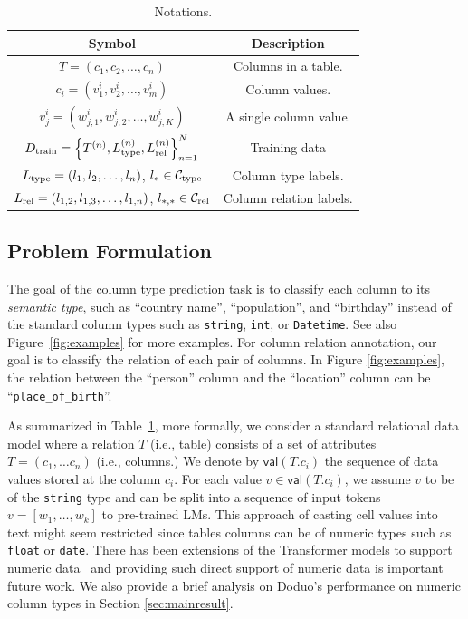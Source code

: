 \documentclass[sigconf]{acmart}
\newcommand{\name}{\mbox{\sc Doduo}}
\newcommand{\rev}[1]{#1}
\begin{document}
\begin{table}[t]
    \centering
    \caption{Notations.}\vspace{-1em}\label{tab:notation}
    {\footnotesize
    \begin{tabular}{c|c}\hline
      Symbol & Description \\\hline\hline
      $T = (c_1, c_2, \dots, c_{n})$ & Columns in a table. \\\hline
      $c_i = (v^i_1, v^i_2, \dots, v^i_{m})$ & Column values. \\\hline
      $v^i_j = (w^i_{j,1}, w^i_{j,2}, \dots, w^i_{j, K} )$ & A single column value. \\\hline
      $D_{\rm train} = \left\{ T^{(n)}, L_{\rm type}^{(n)}, L_{\rm rel}^{(n)} \right\}_{n=1}^N$ & Training data \\\hline
      $L_{\rm type} = (l_1, l_2, \dots, l_{n})$, 
      $l_* \in \mathcal{C}_{\rm type}$ & Column type labels. \\\hline
      $L_{\rm rel} = (l_{1,2}, l_{1,3}, \dots, l_{1, {n}})$, 
      $l_{*,*} \in \mathcal{C}_{\rm rel}$ & Column relation labels.\\\hline
    \end{tabular}
    }
    \vspace{-1em}
\end{table}



\subsection{Problem Formulation}
The goal of the column type prediction task is to classify each column to its \emph{semantic type}, such as
``country name'', ``population'', and ``birthday'' instead of the standard column types such as 
\texttt{string}, \texttt{int}, or \texttt{Datetime}. See also Figure~\ref{fig:examples} for more examples.
For column relation annotation, our goal is to classify the relation of each pair of columns.
In Figure \ref{fig:examples}, the relation between the ``person'' column and the ``location'' column
can be ``\texttt{place\_of\_birth}''.

\newcommand{\val}{\mathsf{val}}
\newcommand{\bfT}{\mathbf{T}}
\newcommand{\calC}{\mathcal{C}}
\newtheorem{problem}{Problem}

\rev{As summarized in Table~\ref{tab:notation}, more formally,} we consider a standard relational data model where a relation $T$ (i.e., table) consists of a set of attributes $T = (c_1, \dots c_n)$ (i.e., columns.) We denote by 
$\val(T.c_i)$ the sequence of data values stored at the column $c_i$. \rev{
For each value $v \in \val(T.c_i)$,
we assume $v$ to be of the \texttt{string} type and 
can be split
into a sequence of input tokens 
$v = [w_1, \dots, w_k]$ to pre-trained LMs.}
%
%
\rev{This approach of casting cell values into text
might seem restricted since tables
columns can be of numeric types such as \texttt{float} or 
\texttt{date}. There has been extensions of the Transformer
models to support numeric data~\cite{wu2020deep} 
and providing such direct support of numeric data is important
future work.
%
We also provide a brief analysis on \name{}'s performance
on numeric column types in Section \ref{sec:mainresult}.
}
\end{document}
